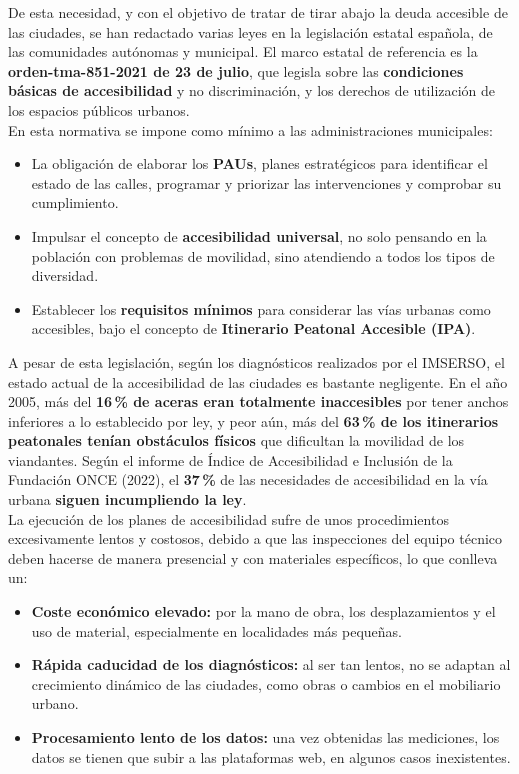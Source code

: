 De esta necesidad, y con el objetivo de tratar de tirar abajo la deuda accesible de las ciudades, se han redactado varias leyes en la legislación estatal española, de las comunidades autónomas y municipal.
El marco estatal de referencia es la \textbf{\gls{orden-tma-851-2021} de 23 de julio}, que legisla sobre las \textbf{condiciones básicas de accesibilidad} y no discriminación, y los derechos de utilización de los espacios públicos urbanos.
\\



En esta normativa se impone como mínimo a las administraciones municipales:
\begin{itemize}
    \item La obligación de elaborar los \textbf{\glspl{PAU}}, planes estratégicos para identificar el estado de las calles, programar y priorizar las intervenciones y comprobar su cumplimiento.
    \item Impulsar el concepto de \textbf{accesibilidad universal}, no solo pensando en la población con problemas de movilidad, sino atendiendo a todos los tipos de diversidad.
    \item Establecer los \textbf{requisitos mínimos} para considerar las vías urbanas como accesibles, bajo el concepto de \textbf{Itinerario Peatonal Accesible (IPA)}.
\end{itemize}
 



A pesar de esta legislación, según los diagnósticos realizados por el IMSERSO, el estado actual de la accesibilidad de las ciudades es bastante negligente. En el año 2005, más del \textbf{16\,\% de aceras eran totalmente inaccesibles} por tener anchos inferiores a lo establecido por ley, y peor aún, más del \textbf{63\,\% de los itinerarios peatonales tenían obstáculos físicos} que dificultan la movilidad de los viandantes. Según el informe de Índice de Accesibilidad e Inclusión de la Fundación ONCE (2022), el \textbf{37\,\%} de las necesidades de accesibilidad en la vía urbana \textbf{siguen incumpliendo la ley}.
\\

La ejecución de los planes de accesibilidad sufre de unos procedimientos excesivamente lentos y costosos, debido a que las inspecciones del equipo técnico deben hacerse de manera presencial y con materiales específicos, lo que conlleva un:
\begin{itemize}
    \item \textbf{Coste económico elevado:} por la mano de obra, los desplazamientos y el uso de material, especialmente en localidades más pequeñas.
    \item \textbf{Rápida caducidad de los diagnósticos:} al ser tan lentos, no se adaptan al crecimiento dinámico de las ciudades, como obras o cambios en el mobiliario urbano.
    \item \textbf{Procesamiento lento de los datos:} una vez obtenidas las mediciones, los datos se tienen que subir a las plataformas web, en algunos casos inexistentes.
\end{itemize}


